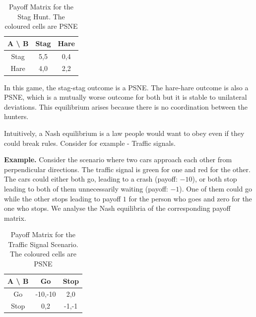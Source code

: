 \documentclass{article}
\theoremstyle{definition}
\begin{document}
\begin{table}[H]
    \begin{adjustbox}{width=5cm,center}
    \begin{tabular}{|c|c|c|}
        \hline
        A \textbackslash \: B & Stag & Hare \\
        \hline
        Stag & \cellcolor{yellow} 5,5 &  0,4 \\
        \hline 
        Hare & 4,0 & \cellcolor{yellow} 2,2  \\
        \hline
    \end{tabular}
    \end{adjustbox}
    \caption{Payoff Matrix for the Stag Hunt. The coloured cells are PSNE}
    \label{table:stag}
\end{table}

In this game, the stag-stag outcome is a PSNE. The hare-hare outcome is also a PSNE, which is a mutually worse outcome for both but it is stable to unilateral deviations. This equilibrium arises because there is no coordination between the hunters. 

Intuitively, a Nash equilibrium is a law people would want to obey even if they could break rules. Consider for example - Traffic signals. \medskip

\textbf{Example.} Consider the scenario where two cars approach each other from perpendicular directions. The traffic signal is green for one and red for the other. The cars could either both go, leading to a crash (payoff: $-10$), or both stop leading to both of them unnecessarily waiting (payoff: $-1$). One of them could go while the other stops leading to payoff $1$ for the person who goes and zero for the one who stops. We analyse the Nash equilibria of the corresponding payoff matrix. \medskip
\begin{table}[H]
    \begin{adjustbox}{width=5cm,center}
    \begin{tabular}{|c|c|c|}
        \hline
        A \textbackslash \: B & Go & Stop \\
        \hline
        Go & -10,-10 &  \cellcolor{yellow} 2,0 \\
        \hline 
        Stop & \cellcolor{yellow} 0,2 & -1,-1  \\
        \hline
    \end{tabular}
    \end{adjustbox}
    \caption{Payoff Matrix for the Traffic Signal Scenario. The coloured cells are PSNE}
    \label{table:traffic}
\end{table}
\end{document}
